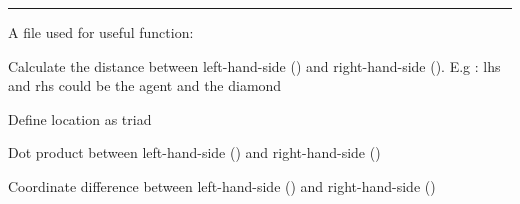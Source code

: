 \documentclass[letterpaper,10pt,english]{sphinxmanual}
\begin{document}
\bigskip\hrule\bigskip


A file used for useful function:

\begin{fulllineitems}
\label{\detokenize{index:heuristics.distance}}
Calculate the distance between left-hand-side () and right-hand-side ().
E.g : lhs and rhs could be the agent and the diamond

\end{fulllineitems}


\begin{fulllineitems}
\label{\detokenize{index:heuristics.location}}
Define location as  triad

\end{fulllineitems}


\begin{fulllineitems}
\label{\detokenize{index:heuristics.dot}}
Dot product between left-hand-side () and right-hand-side ()

\end{fulllineitems}


\begin{fulllineitems}
\label{\detokenize{index:heuristics.diff}}
Coordinate difference between left-hand-side () and right-hand-side ()

\end{fulllineitems}
\end{document}
